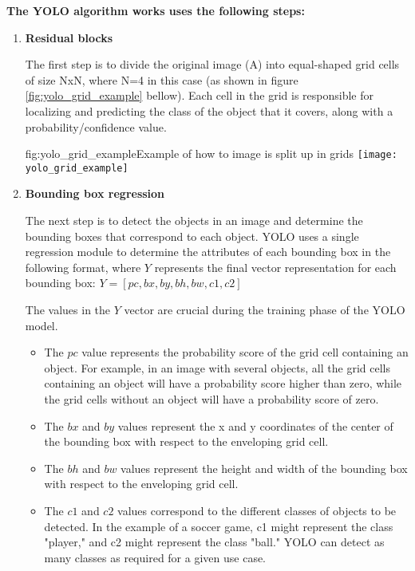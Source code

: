 \textbf{The YOLO algorithm works uses the following steps:}
\begin{enumerate}

    \item \textbf{Residual blocks}

          The first step is to divide the original image (A) into equal-shaped grid cells
          of size NxN, where N=4 in this case (as shown in figure
          \ref{fig:yolo_grid_example} bellow). Each cell in the grid is responsible for
          localizing and predicting the class of the object that it covers, along with a
          probability/confidence value.

          \begin{linfigure}{fig:yolo_grid_example}{Example of how to image is split up in grids}
              \texttt{[image: yolo\_grid\_example]}
          \end{linfigure}

    \item \textbf{Bounding box regression}

          The next step is to detect the objects in an image and determine the bounding
          boxes that correspond to each object. YOLO uses a single regression module to
          determine the attributes of each bounding box in the following format, where
          \(Y\) represents the final vector representation for each bounding box: \(Y =
          [pc, bx, by, bh, bw, c1, c2]\)

          The values in the \(Y\) vector are crucial during the training phase of the
          YOLO model.

          \begin{itemize}
              \item The \(pc\) value represents the probability score of the grid cell containing
                    an object. For example, in an image with several objects, all the grid cells
                    containing an object will have a probability score higher than zero, while the
                    grid cells without an object will have a probability score of zero.
              \item The \(bx\) and \(by\) values represent the x and y coordinates of the center of
                    the bounding box with respect to the enveloping grid cell.
              \item The \(bh\) and \(bw\) values represent the height and width of the bounding box
                    with respect to the enveloping grid cell.
              \item The \(c1\) and \(c2\) values correspond to the different classes of objects to
                    be detected. In the example of a soccer game, c1 might represent the class
                    "player," and c2 might represent the class "ball." YOLO can detect as many
                    classes as required for a given use case.
          \end{itemize}


\end{enumerate}
